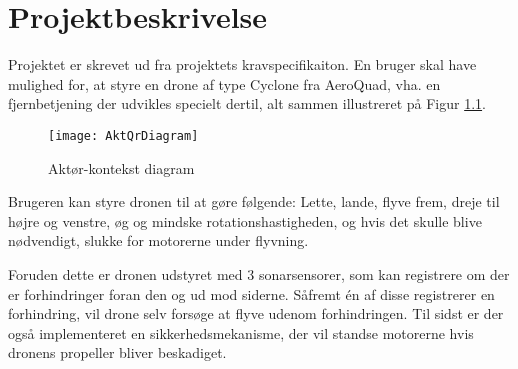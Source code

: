 \documentclass[Main]{subfiles}
\begin{document}
		
	

\chapter{Projektbeskrivelse}

Projektet er skrevet ud fra projektets kravspecifikaiton\cite[p. 18-23]{Kravspec}.
En bruger skal have mulighed for, at styre en drone af type Cyclone fra AeroQuad\cite{AQ-store}, vha. en fjernbetjening der udvikles specielt dertil, alt sammen illustreret på Figur \ref{Fig:Aktor-oversigt}.

\begin{figure}[H]
\centering
\texttt{[image: AktQrDiagram]}
\caption{Aktør-kontekst diagram}
\label{Fig:Aktor-oversigt}
\end{figure}

Brugeren kan styre dronen til at gøre følgende: Lette, lande, flyve frem, dreje til højre og venstre, øg og mindske rotationshastigheden, og hvis det skulle blive nødvendigt, slukke for motorerne under flyvning.

Foruden dette er dronen udstyret med 3 sonarsensorer, som kan registrere om der er forhindringer foran den og ud mod siderne.
Såfremt én af disse registrerer en forhindring, vil drone selv forsøge at flyve udenom forhindringen.
Til sidst er der også implementeret en sikkerhedsmekanisme, der vil standse motorerne hvis dronens propeller bliver beskadiget.
\end{document}
